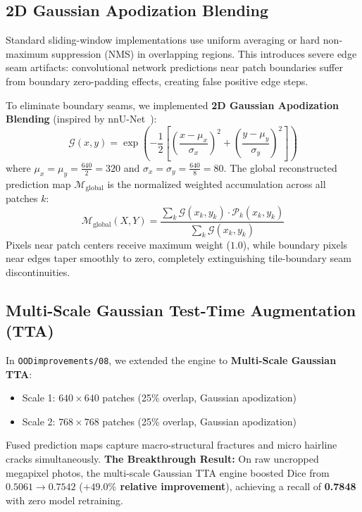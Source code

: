 \documentclass[11pt,a4paper]{article}
\begin{document}
\subsection{2D Gaussian Apodization Blending}
Standard sliding-window implementations use uniform averaging or hard non-maximum suppression (NMS) in overlapping regions. 
This introduces severe edge seam artifacts: convolutional network predictions near patch boundaries suffer from boundary zero-padding effects, creating false positive edge steps.

To eliminate boundary seams, we implemented \textbf{2D Gaussian Apodization Blending} (inspired by nnU-Net~\cite{isensee2021nnu}):
\begin{equation}
  \mathcal{G}(x, y) = \exp\left( -\frac{1}{2} \left[ \left( \frac{x - \mu_x}{\sigma_x} \right)^2 + \left( \frac{y - \mu_y}{\sigma_y} \right)^2 \right] \right)
\end{equation}
where $\mu_x = \mu_y = \frac{640}{2} = 320$ and $\sigma_x = \sigma_y = \frac{640}{8} = 80$.
The global reconstructed prediction map $\mathcal{M}_{\text{global}}$ is the normalized weighted accumulation across all patches $k$:
\begin{equation}
  \mathcal{M}_{\text{global}}(X, Y) = \frac{\sum_k \mathcal{G}(x_k, y_k) \cdot \mathcal{P}_k(x_k, y_k)}{\sum_k \mathcal{G}(x_k, y_k)}
\end{equation}
Pixels near patch centers receive maximum weight ($1.0$), while boundary pixels near edges taper smoothly to zero, completely extinguishing tile-boundary seam discontinuities.

\subsection{Multi-Scale Gaussian Test-Time Augmentation (TTA)}
In \texttt{OODimprovements/08}, we extended the engine to \textbf{Multi-Scale Gaussian TTA}:
\begin{itemize}[leftmargin=1.5em]
  \item Scale 1: $640\times640$ patches (25\% overlap, Gaussian apodization)
  \item Scale 2: $768\times768$ patches (25\% overlap, Gaussian apodization)
\end{itemize}
Fused prediction maps capture macro-structural fractures and micro hairline cracks simultaneously.
\textbf{The Breakthrough Result:} On raw uncropped megapixel photos, the multi-scale Gaussian TTA engine boosted Dice from $0.5061 \to \mathbf{0.7542}$ (\textbf{$+49.0\%$ relative improvement}), achieving a recall of \textbf{0.7848} with zero model retraining.
\end{document}
